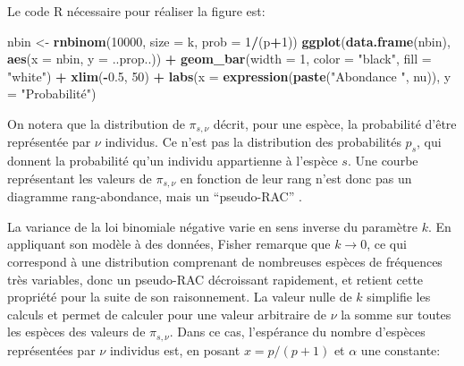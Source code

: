 \documentclass[
  11pt,
  french,
  a4paper,
  extrafontsizes,onecolumn,openright
  ]{memoir}
\newenvironment{Shaded}{\begin{snugshade}}{\end{snugshade}}
\newcommand{\DataTypeTok}[1]{\textcolor[rgb]{0.13,0.29,0.53}{#1}}
\newcommand{\DecValTok}[1]{\textcolor[rgb]{0.00,0.00,0.81}{#1}}
\newcommand{\FloatTok}[1]{\textcolor[rgb]{0.00,0.00,0.81}{#1}}
\newcommand{\KeywordTok}[1]{\textcolor[rgb]{0.13,0.29,0.53}{\textbf{#1}}}
\newcommand{\NormalTok}[1]{#1}
\newcommand{\OperatorTok}[1]{\textcolor[rgb]{0.81,0.36,0.00}{\textbf{#1}}}
\newcommand{\StringTok}[1]{\textcolor[rgb]{0.31,0.60,0.02}{#1}}
\begin{document}
\normalsize

Le code R nécessaire pour réaliser la figure est:

\scriptsize

\begin{Shaded}
\begin{Highlighting}[]
\NormalTok{nbin <-}\StringTok{ }\KeywordTok{rnbinom}\NormalTok{(}\DecValTok{10000}\NormalTok{, }\DataTypeTok{size =}\NormalTok{ k, }\DataTypeTok{prob =} \DecValTok{1}\OperatorTok{/}\NormalTok{(p}\OperatorTok{+}\DecValTok{1}\NormalTok{))}
\KeywordTok{ggplot}\NormalTok{(}\KeywordTok{data.frame}\NormalTok{(nbin), }\KeywordTok{aes}\NormalTok{(}\DataTypeTok{x =}\NormalTok{ nbin, }\DataTypeTok{y =}\NormalTok{ ..prop..)) }\OperatorTok{+}\StringTok{ }
\StringTok{  }\KeywordTok{geom_bar}\NormalTok{(}\DataTypeTok{width =} \DecValTok{1}\NormalTok{, }\DataTypeTok{color =} \StringTok{"black"}\NormalTok{, }\DataTypeTok{fill =} \StringTok{"white"}\NormalTok{) }\OperatorTok{+}
\StringTok{  }\KeywordTok{xlim}\NormalTok{(}\OperatorTok{-}\FloatTok{0.5}\NormalTok{, }\DecValTok{50}\NormalTok{) }\OperatorTok{+}
\StringTok{  }\KeywordTok{labs}\NormalTok{(}\DataTypeTok{x =} \KeywordTok{expression}\NormalTok{(}\KeywordTok{paste}\NormalTok{(}\StringTok{"Abondance "}\NormalTok{, nu)), }\DataTypeTok{y =} \StringTok{"Probabilité"}\NormalTok{)}
\end{Highlighting}
\end{Shaded}

\normalsize

On notera que la distribution de \({\pi}_{s,\nu}\) décrit, pour une espèce, la probabilité d'être représentée par \(\nu\) individus.
Ce n'est pas la distribution des probabilités \(p_s\), qui donnent la probabilité qu'un individu appartienne à l'espèce \(s\).
Une courbe représentant les valeurs de \({\pi}_{s,\nu}\) en fonction de leur rang n'est donc pas un diagramme rang-abondance, mais un \enquote{pseudo-RAC} \autocite{Izsak2012}.

La variance de la loi binomiale négative varie en sens inverse du paramètre \(k\).
En appliquant son modèle à des données, Fisher remarque que \(k \to 0\), ce qui correspond à une distribution comprenant de nombreuses espèces de fréquences très variables, donc un pseudo-RAC décroissant rapidement, et retient cette propriété pour la suite de son raisonnement.
La valeur nulle de \(k\) simplifie les calculs et permet de calculer pour une valeur arbitraire de \(\nu\) la somme sur toutes les espèces des valeurs de \({\pi}_{s,\nu}\).
Dans ce cas, l'espérance du nombre d'espèces représentées par \(\nu\) individus est, en posant \(x=p/(p+1)\) et \(\alpha\) une constante:
\end{document}
